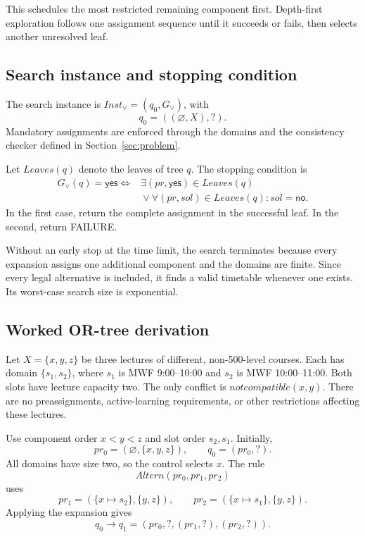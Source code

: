 This schedules the most restricted remaining component
first. Depth-first exploration follows one assignment
sequence until it succeeds or fails, then selects another
unresolved leaf.

\subsection{Search instance and stopping condition}
\label{sec:or-instance}

The search instance is
$\mathit{Inst}_{\lor}=(q_0,G_{\lor})$, with
\[
q_0=((\varnothing,X),?).
\]
Mandatory assignments are enforced through the domains and
the consistency checker defined in Section~\ref{sec:problem}.

Let $\mathit{Leaves}(q)$ denote the leaves of tree $q$.
The stopping condition is
\[
\begin{aligned}
G_{\lor}(q)=\mathsf{yes}\iff{}&
\exists(pr,\mathsf{yes})\in\mathit{Leaves}(q)\\
&{}\lor
\forall(pr,sol)\in\mathit{Leaves}(q):
sol=\mathsf{no}.
\end{aligned}
\]
In the first case, return the complete assignment in the
successful leaf. In the second, return FAILURE.

Without an early stop at the time limit, the search terminates
because every expansion assigns one additional component and
the domains are finite. Since every legal alternative is
included, it finds a valid timetable whenever one exists.
Its worst-case search size is exponential.

\subsection{Worked OR-tree derivation}
\label{sec:or-example}

Let $X=\{x,y,z\}$ be three lectures of different,
non-500-level courses. Each has domain $\{s_1,s_2\}$,
where $s_1$ is MWF 9:00--10:00 and $s_2$ is
MWF 10:00--11:00. Both slots have lecture capacity two.
The only conflict is $\mathit{notcompatible}(x,y)$.
There are no preassignments, active-learning requirements,
or other restrictions affecting these lectures.

Use component order $x<y<z$ and slot order $s_2,s_1$.
Initially,
\[
pr_0=(\varnothing,\{x,y,z\}),
\qquad q_0=(pr_0,?).
\]
All domains have size two, so the control selects $x$.
The rule
\[
\mathit{Altern}(pr_0,pr_1,pr_2)
\]
uses
\[
pr_1=(\{x\mapsto s_2\},\{y,z\}),
\qquad
pr_2=(\{x\mapsto s_1\},\{y,z\}).
\]
Applying the expansion gives
\[
q_0\longrightarrow
q_1=(pr_0,?,(pr_1,?),(pr_2,?)).
\]

